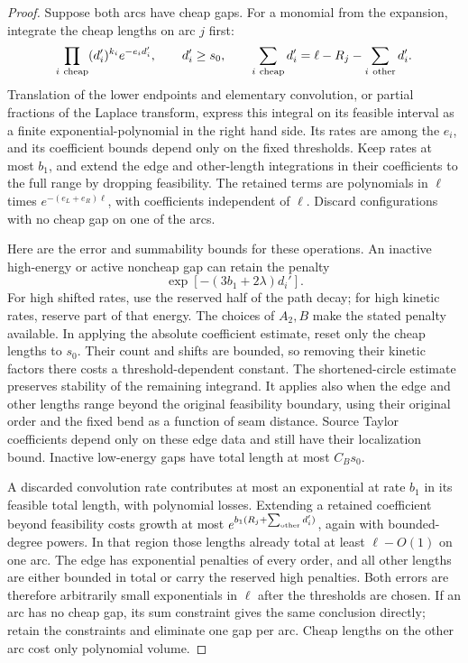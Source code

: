 \begin{proof}
Suppose both arcs have cheap gaps. For a monomial from the expansion,
integrate the cheap lengths on arc \(j\) first:
\[
 \prod_{i\ {\rm cheap}}(d_i')^{k_i}e^{-e_i d_i'},\qquad
 d_i'\ge s_0,\qquad
 \sum_{i\ {\rm cheap}}d_i'
       =\ell-R_j-\sum_{i\ {\rm other}}d_i'.
\]
Translation of the lower endpoints and elementary convolution, or
partial fractions of the Laplace transform, express this integral on
its feasible interval as a finite exponential-polynomial in the right
hand side. Its rates are among the \(e_i\), and its coefficient bounds
depend only on the fixed thresholds. Keep rates at most \(b_1\), and
extend the edge and other-length integrations in their coefficients to
the full range by dropping feasibility. The retained terms are
polynomials in \(\ell\) times
\(e^{-(e_L+e_R)\ell}\), with coefficients independent of \(\ell\).
Discard configurations with no cheap gap on one of the arcs.

Here are the error and summability bounds for these operations. An
inactive high-energy or active noncheap gap can retain the penalty
\[
 \exp[-(3b_1+2\lambda)d_i'].
\]
For high shifted rates, use the reserved half of the path decay; for
high kinetic rates, reserve part of that energy. The choices of
\(A_2,B\) make the stated penalty available. In applying the absolute
coefficient estimate, reset only the cheap lengths to \(s_0\).
Their count and shifts are bounded, so removing their kinetic factors
there costs a threshold-dependent constant. The shortened-circle
estimate preserves stability of the remaining integrand. It applies
also when the edge and other lengths range beyond the original
feasibility boundary, using their original order and the fixed bend
as a function of seam distance. Source Taylor coefficients depend
only on these edge data and still have their localization bound.
Inactive low-energy gaps have total length at most \(C_Bs_0\).

A discarded convolution rate contributes at most an exponential at
rate \(b_1\) in its feasible total length, with polynomial losses.
Extending a retained coefficient beyond feasibility costs growth at
most \(e^{b_1(R_j+\sum_{\rm other}d_i')}\), again with bounded-degree
powers. In that region those lengths already total at least
\(\ell-O(1)\) on one arc. The edge has exponential penalties of every
order, and all other lengths are either bounded in total or carry the
reserved high penalties. Both errors are therefore arbitrarily small
exponentials in \(\ell\) after the thresholds are chosen. If an arc has
no cheap gap, its sum constraint gives the same conclusion directly;
retain the constraints and eliminate one gap per arc. Cheap lengths on
the other arc cost only polynomial volume.


\end{proof}
